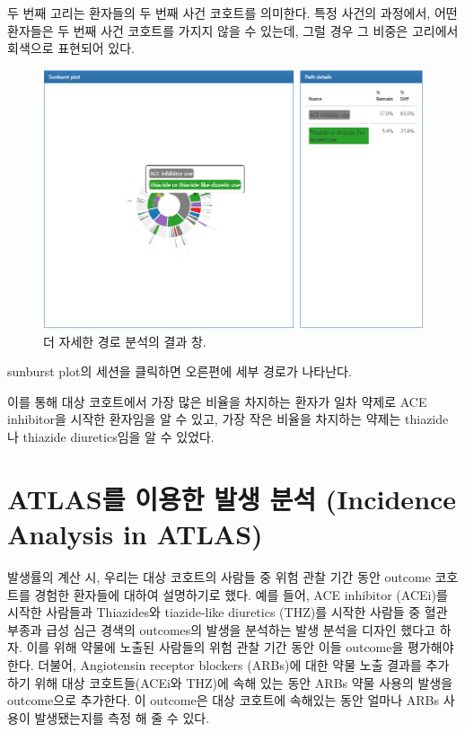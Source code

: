 \documentclass[11pt]{book}
\theoremstyle{definition}
\theoremstyle{definition}
\theoremstyle{definition}
\theoremstyle{remark}
\begin{document}
두 번째 고리는 환자들의 두 번째 사건 코호트를 의미한다. 특정 사건의
과정에서, 어떤 환자들은 두 번째 사건 코호트를 가지지 않을 수 있는데,
그럴 경우 그 비중은 고리에서 회색으로 표현되어 있다.

\begin{figure}

{\centering \includegraphics[width=1\linewidth]{images/Characterization/atlasPathwaysResultsPathDetails} 

}

\caption{더 자세한 경로 분석의 결과 창.}\label{fig:atlasPathwaysResultsPathDetails}
\end{figure}

sunburst plot의 세션을 클릭하면 오른편에 세부 경로가 나타난다.

이를 통해 대상 코호트에서 가장 많은 비율을 차지하는 환자가 일차 약제로
ACE inhibitor을 시작한 환자임을 알 수 있고, 가장 작은 비율을 차지하는
약제는 thiazide나 thiazide diuretics임을 알 수 있었다.

\section{ATLAS를 이용한 발생 분석 (Incidence Analysis in
ATLAS)}\label{atlas----incidence-analysis-in-atlas}

발생률의 계산 시, 우리는 대상 코호트의 사람들 중 위험 관찰 기간 동안
outcome 코호트를 경험한 환자들에 대하여 설명하기로 했다. 예를 들어, ACE
inhibitor (ACEi)를 시작한 사람들과 Thiazides와 tiazide-like diuretics
(THZ)를 시작한 사람들 중 혈관 부종과 급성 심근 경색의 outcomes의 발생을
분석하는 발생 분석을 디자인 했다고 하자. 이를 위해 약물에 노출된
사람들의 위험 관찰 기간 동안 이들 outcome을 평가해야 한다. 더불어,
Angiotensin receptor blockers (ARBs)에 대한 약물 노출 결과를 추가하기
위해 대상 코호트들(ACEi와 THZ)에 속해 있는 동안 ARBs 약물 사용의 발생을
outcome으로 추가한다. 이 outcome은 대상 코호트에 속해있는 동안 얼마나
ARBs 사용이 발생됐는지를 측정 해 줄 수 있다.
\end{document}
